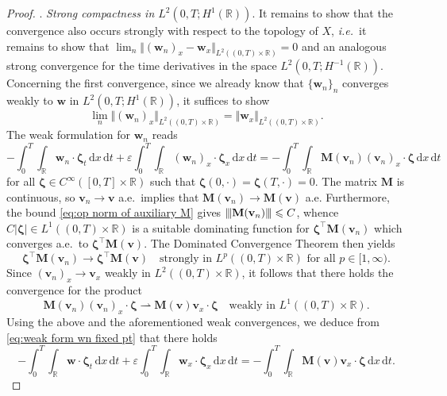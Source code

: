 \documentclass[10pt,a4paper]{amsart}
\newcommand{\bM}{\mathbf{M}}
\newcommand{\bv}{\mathbf{v}}
\newcommand{\bw}{\mathbf{w}}
\newcommand{\bzeta}{\boldsymbol{\zeta}}
\newcommand{\vertiii}[1]{{\left\vert\kern-0.25ex\left\vert\kern-0.25ex\left\vert #1 
    \right\vert\kern-0.25ex\right\vert\kern-0.25ex\right\vert}}
\renewcommand{\d}{\, \mathrm{d}}
\renewcommand{\leq}{\leqslant}
\begin{document}
\begin{proof}
\smallskip 
{}. \textit{Strong compactness in $L^2(0,T;H^1(\mathbb{R}))$}. It remains to show that the convergence also occurs strongly with respect to the topology of $X$, \textit{i.e.}~it remains to show that $\lim_n \Vert (\bw_n)_x - \bw_x \Vert_{L^2((0,T)\times\mathbb{R})} = 0$ and an analogous strong convergence for the time derivatives in the space $L^2(0,T;H^{-1}(\mathbb{R}))$. Concerning the first convergence, since we already know that $\{\bw_n\}_n$ converges weakly to $\bw$ in $L^2(0,T;H^1(\mathbb{R}))$, it suffices to show 
\begin{equation}\label{eq:required strong conv for cpct fixed pt}
    \lim_n \Vert (\bw_n)_x \Vert_{L^2((0,T)\times\mathbb{R})} = \Vert \bw_x \Vert_{L^2((0,T)\times\mathbb{R})}. 
\end{equation}
The weak formulation for $\bw_n$ reads 
\begin{equation}\label{eq:weak form wn fixed pt}
   -\int_0^T \int_\mathbb{R} \bw_n \cdot \bzeta_t \d x \d t + \varepsilon \int_0^T \int_\mathbb{R} (\bw_n)_x \cdot \bzeta_x \d x \d t = - \int_0^T \int_\mathbb{R} \bM(\bv_n) (\bv_n)_x \cdot \bzeta \d x \d t 
\end{equation}
for all $\bzeta \in C^\infty([0,T]\times\mathbb{R})$ such that $\bzeta(0,\cdot)=\bzeta(T,\cdot) = 0$. The matrix $\bM$ is continuous, so $\bv_n \to \bv$ a.e.~implies that $\bM(\bv_n) \to \bM(\bv)$ a.e. Furthermore, the bound \eqref{eq:op norm of auxiliary M} gives $\vertiii{\bM(\bv_n)} \leq C$, whence $C|\bzeta| \in L^1((0,T)\times\mathbb{R})$ is a suitable dominating function for $\bzeta^\intercal \bM(\bv_n)$ which converges a.e.~to $\bzeta^\intercal \bM(\bv)$. The Dominated Convergence Theorem then yields 
\begin{equation*}
    \bzeta^\intercal \bM(\bv_n) \to \bzeta^\intercal \bM(\bv) \quad \text{strongly in } L^p((0,T)\times\mathbb{R}) \text{ for all } p \in [1,\infty). 
\end{equation*}
Since $(\bv_n)_x \to \bv_x$ weakly in $L^2((0,T)\times\mathbb{R})$, it follows that there holds the convergence for the product 
\begin{equation*}
    \bM(\bv_n) (\bv_n)_x \cdot \bzeta \rightharpoonup \bM(\bv) \bv_x \cdot \bzeta \quad \text{weakly in } L^1((0,T)\times\mathbb{R}). 
\end{equation*}
Using the above and the aforementioned weak convergences, we deduce from \eqref{eq:weak form wn fixed pt} that there holds 
\begin{equation}\label{eq:weak form w fixed pt}
   -\int_0^T \int_\mathbb{R} \bw \cdot \bzeta_t \d x \d t + \varepsilon \int_0^T \int_\mathbb{R} \bw_x \cdot \bzeta_x \d x \d t = - \int_0^T \int_\mathbb{R} \bM(\bv) \bv_x \cdot \bzeta \d x \d t. 

\end{equation}
\end{proof}
\end{document}
